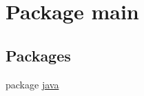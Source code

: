 \hypertarget{namespacemain}{\section{Package main}
\label{namespacemain}
}
\subsection*{Packages}
\begin{DoxyCompactItemize}
\item 
package \hyperlink{namespacemain_1_1java}{java}
\end{DoxyCompactItemize}
